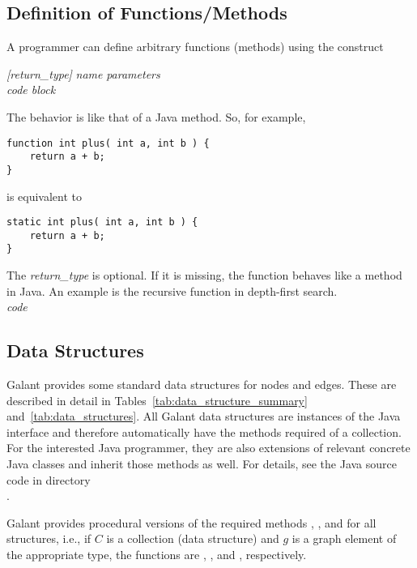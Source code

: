 \subsection{Definition of Functions/Methods}\label{sec:functions}

A programmer can define arbitrary functions (methods) using the construct

 \textsl{[return\_type]} \textsl{name} \Code{(}
 \textsl{parameters} \Code{) \{} \\
 \hspace*{3em} \emph{code block} \\
 \Code{\}}

The behavior is like that of a Java method. So, for example,
\begin{verbatim}
function int plus( int a, int b ) {
    return a + b;
}
\end{verbatim}
is equivalent to
\begin{verbatim}
static int plus( int a, int b ) {
    return a + b;
}
\end{verbatim}

The \textsl{return\_type} is optional. If it is missing, the function behaves like
a  method in Java. An example is the recursive function
 in depth-first search.
\\
 \textsl{code} \Code{\}}





\subsection{Data Structures} \label{sec:datastructures}

Galant provides some standard data structures for nodes and edges.
These are described in detail in Tables~\ref{tab:data_structure_summary}
and~\ref{tab:data_structures}.
All Galant data structures are instances of the Java 
interface and therefore automatically have the methods required of a
collection. For the interested Java programmer, they are also extensions of
relevant concrete Java classes and inherit those methods as well. For
details, see the Java source code in directory\\
.

Galant provides procedural versions of the required methods ,
,  and  for all structures, i.e., if $C$
is a collection (data structure) and $g$ is a graph element of the
appropriate type, the functions are , ,
 and , respectively.

